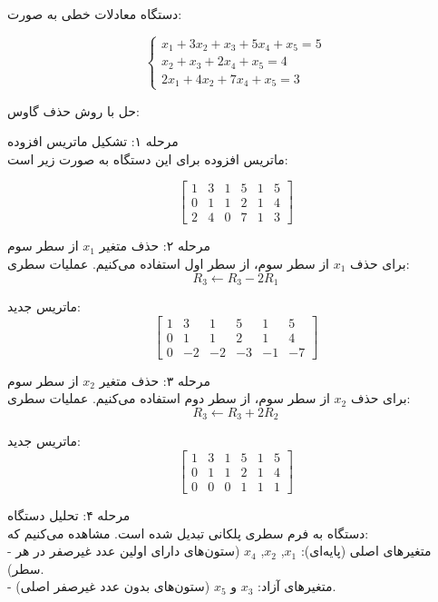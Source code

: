 {\scriptsize  \begin{example}[]
	 دستگاه معادلات خطی به صورت:
	
	\[
	\begin{cases}
		x_1 + 3x_2 + x_3 + 5x_4 + x_5 = 5 \\
		x_2 + x_3 + 2x_4 + x_5 = 4 \\
		2x_1 + 4x_2 + 7x_4 + x_5 = 3
	\end{cases}
	\]
	
	 حل با روش حذف گاوس:
	
	مرحله ۱: تشکیل ماتریس افزوده  \\
	ماتریس افزوده برای این دستگاه به صورت زیر است:
	
	\[
	\left[
	\begin{array}{ccccc|c}
		1 & 3 & 1 & 5 & 1 & 5 \\
		0 & 1 & 1 & 2 & 1 & 4 \\
		2 & 4 & 0 & 7 & 1 & 3
	\end{array}
	\right]
	\]
	
	
	مرحله ۲: حذف متغیر \(x_1\) از سطر سوم  \\
	برای حذف \(x_1\) از سطر سوم، از سطر اول استفاده می‌کنیم. عملیات سطری:
	\[
	R_3 \leftarrow R_3 - 2R_1
	\]
	
	ماتریس جدید:
	\[
	\left[
	\begin{array}{ccccc|c}
		1 & 3 & 1 & 5 & 1 & 5 \\
		0 & 1 & 1 & 2 & 1 & 4 \\
		0 & -2 & -2 & -3 & -1 & -7
	\end{array}
	\right]
	\]
	
	
	مرحله ۳: حذف متغیر \(x_2\) از سطر سوم \\ 
	برای حذف \(x_2\) از سطر سوم، از سطر دوم استفاده می‌کنیم. عملیات سطری:
	\[
	R_3 \leftarrow R_3 + 2R_2
	\]
	
	ماتریس جدید:
	\[
	\left[
	\begin{array}{ccccc|c}
		1 & 3 & 1 & 5 & 1 & 5 \\
		0 & 1 & 1 & 2 & 1 & 4 \\
		0 & 0 & 0 & 1 & 1 & 1
	\end{array}
	\right]
	\]
	
	
	مرحله ۴: تحلیل دستگاه  \\
	دستگاه به فرم سطری پلکانی  تبدیل شده است. مشاهده می‌کنیم که:\\
	- متغیرهای اصلی (پایه‌ای): \(x_1\), \(x_2\), \(x_4\) (ستون‌های دارای اولین عدد غیرصفر در هر سطر).\\
	- متغیرهای آزاد: \(x_3\) و \(x_5\) (ستون‌های بدون عدد غیرصفر اصلی).\\
	


\end{example}}
